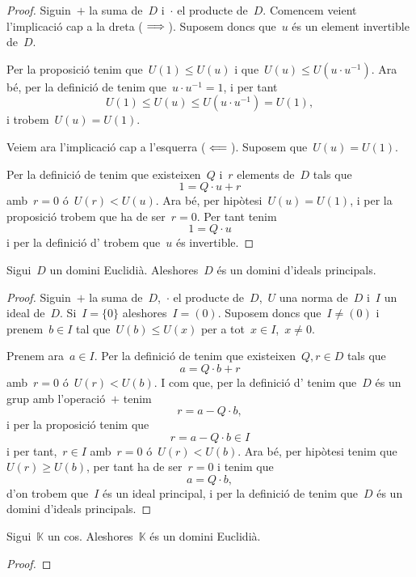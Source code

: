 \documentclass[../estructures-algebraiques.tex]{subfiles}
\begin{document}
    \begin{proof}
        Siguin~\(+\) la suma de~\(D\) i~\(\cdot\) el producte de~\(D\).
        Comencem veient l'implicació cap a la dreta (\(\implies\)).
        Suposem doncs que~\(u\) és un element invertible de~\(D\).

        Per la proposició  tenim que~\(U(1)\leq U(u)\) i que~\(U(u)\leq U(u\cdot u^{-1})\).
        Ara bé, per la definició de  tenim que~\(u\cdot u^{-1}=1\), i per tant
        \[
            U(1)\leq U(u)\leq U(u\cdot u^{-1})=U(1),
        \]
        i trobem~\(U(u)=U(1)\).

        Veiem ara l'implicació cap a l'esquerra (\(\impliedby\)).
        Suposem que~\(U(u)=U(1)\).

        Per la definició de  tenim que existeixen~\(Q\) i~\(r\) elements de~\(D\) tals que
        \[
            1=Q\cdot u+r
        \]
        amb~\(r=0\) ó~\(U(r)<U(u)\).
        Ara bé, per hipòtesi~\(U(u)=U(1)\), i per la proposició  trobem que ha de ser~\(r=0\).
        Per tant tenim
        \[
            1=Q\cdot u
        \]
        i per la definició d' trobem que~\(u\) és invertible.
    \end{proof}
    \begin{theorem}
        Sigui~\(D\) un domini Euclidià.
        Aleshores~\(D\) és un domini d'ideals principals.
    \end{theorem}
    \begin{proof}
        Siguin~\(+\) la suma de~\(D\),~\(\cdot\) el producte de~\(D\),~\(U\) una norma de~\(D\) i~\(I\) un ideal de~\(D\).
        Si~\(I=\{0\}\) aleshores~\(I=(0)\).
        Suposem doncs que~\(I\neq(0)\) i prenem~\(b\in I\) tal que~\(U(b)\leq U(x)\) per a tot~\(x\in I\),~\(x\neq0\).

        Prenem ara~\(a\in I\).
        Per la definició de  tenim que existeixen~\(Q,r\in D\) tals que
        \[
            a=Q\cdot b+r
        \]
        amb~\(r=0\) ó~\(U(r)<U(b)\).
        I com que, per la definició d' tenim que~\(D\) és un grup amb l'operació~\(+\) tenim
        \[
            r=a-Q\cdot b,
        \]
        i per la proposició  tenim que
        \[
            r=a-Q\cdot b\in I
        \]
        i per tant,~\(r\in I\) amb~\(r=0\) ó~\(U(r)<U(b)\).
        Ara bé, per hipòtesi tenim que~\(U(r)\geq U(b)\), per tant ha de ser~\(r=0\) i tenim que
        \[
            a=Q\cdot b,
        \]
        d'on trobem que~\(I\) és un ideal principal, i per la definició de  tenim que~\(D\) és un domini d'ideals principals.
    \end{proof}
    \begin{theorem}
        Sigui~\(\mathbb{K}\) un cos.
        Aleshores~\(\mathbb{K}\) és un domini Euclidià.
    \end{theorem}
    \begin{proof}
    \end{proof}
\end{document}
